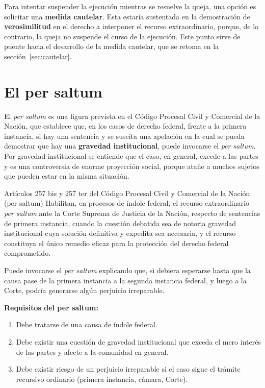\documentclass[12pt,oneside]{book}
\begin{document}
Para intentar suspender la ejecución mientras se resuelve la queja, una opción es solicitar una \textbf{medida cautelar}. Esta estaría sustentada en la demostración de \textbf{verosimilitud} en el derecho a interponer el recurso extraordinario, porque, de lo contrario, la queja no suspende el curso de la ejecución. Este punto sirve de puente hacia el desarrollo de la medida cautelar, que se retoma en la sección~\ref{sec:cautelar}.

\section{El per saltum}
\label{sec:persaltum}

El \textit{per saltum} es una figura prevista en el Código Procesal Civil y Comercial de la Nación, que establece que, en los casos de derecho federal, frente a la primera instancia, si hay una sentencia y se suscita una apelación en la cual se pueda demostrar que hay una \textbf{gravedad institucional}, puede invocarse el \textit{per saltum}. Por gravedad institucional se entiende que el caso, en general, excede a las partes y es una controversia de enorme proyección social, porque atañe a muchos sujetos que pueden estar en la misma situación.

\begin{norma}{Artículos 257 bis y 257 ter del Código Procesal Civil y Comercial de la Nación (per saltum)}
Habilitan, en procesos de índole federal, el recurso extraordinario \textit{per saltum} ante la Corte Suprema de Justicia de la Nación, respecto de sentencias de primera instancia, cuando la cuestión debatida sea de notoria gravedad institucional cuya solución definitiva y expedita sea necesaria, y el recurso constituya el único remedio eficaz para la protección del derecho federal comprometido.
\end{norma}

Puede invocarse el \textit{per saltum} explicando que, si debiera esperarse hasta que la causa pase de la primera instancia a la segunda instancia federal, y luego a la Corte, podría generarse algún perjuicio irreparable.

\textbf{Requisitos del per saltum:}

\begin{enumerate}
    \item Debe tratarse de una causa de índole federal.
    \item Debe existir una cuestión de gravedad institucional que exceda el mero interés de las partes y afecte a la comunidad en general.
    \item Debe existir riesgo de un perjuicio irreparable si el caso sigue el trámite recursivo ordinario (primera instancia, cámara, Corte).
\end{enumerate}
\end{document}
